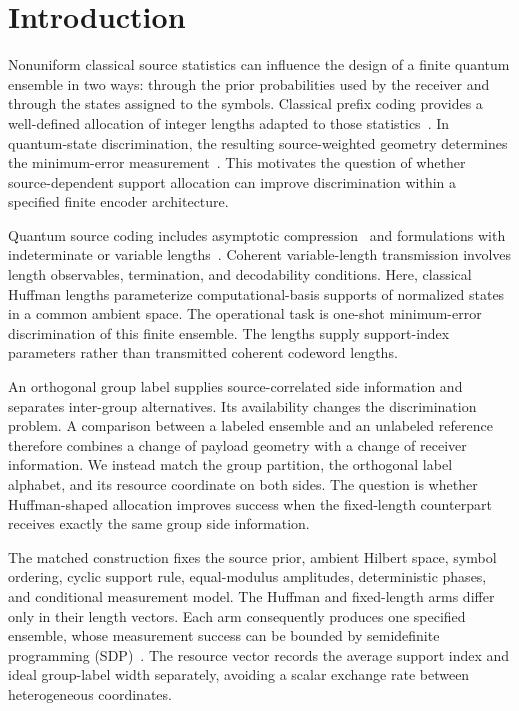 \documentclass[reprint,amsmath,amssymb,aps,pra,floatfix]{revtex4-2}
\begin{document}
\section{Introduction}
Nonuniform classical source statistics can influence the design of a finite quantum ensemble in two ways: through the prior probabilities used by the receiver and through the states assigned to the symbols. Classical prefix coding provides a well-defined allocation of integer lengths adapted to those statistics~\cite{shannon1948mathematical,huffman1952method,cover2006elements}. In quantum-state discrimination, the resulting source-weighted geometry determines the minimum-error measurement~\cite{helstrom1976quantum,holevo1973statistical,yuen1975optimum,barnett2009quantum,bae2015quantum}. This motivates the question of whether source-dependent support allocation can improve discrimination within a specified finite encoder architecture.

Quantum source coding includes asymptotic compression~\cite{schumacher1995quantum,jozsa1994new} and formulations with indeterminate or variable lengths~\cite{braunstein2000quantum,schumacher2001indeterminate,bostrom2002lossless,muller2009variable}. Coherent variable-length transmission involves length observables, termination, and decodability conditions. Here, classical Huffman lengths parameterize computational-basis supports of normalized states in a common ambient space. The operational task is one-shot minimum-error discrimination of this finite ensemble. The lengths supply support-index parameters rather than transmitted coherent codeword lengths.

An orthogonal group label supplies source-correlated side information and separates inter-group alternatives. Its availability changes the discrimination problem. A comparison between a labeled ensemble and an unlabeled reference therefore combines a change of payload geometry with a change of receiver information. We instead match the group partition, the orthogonal label alphabet, and its resource coordinate on both sides. The question is whether Huffman-shaped allocation improves success when the fixed-length counterpart receives exactly the same group side information.

The matched construction fixes the source prior, ambient Hilbert space, symbol ordering, cyclic support rule, equal-modulus amplitudes, deterministic phases, and conditional measurement model. The Huffman and fixed-length arms differ only in their length vectors. Each arm consequently produces one specified ensemble, whose measurement success can be bounded by semidefinite programming (SDP)~\cite{eldar2003designing,watrous2018theory,boyd2004convex}. The resource vector records the average support index and ideal group-label width separately, avoiding a scalar exchange rate between heterogeneous coordinates.
\end{document}

